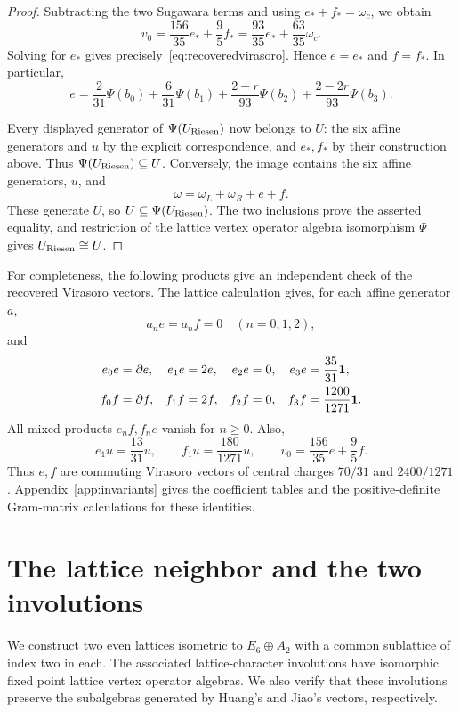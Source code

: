 \documentclass[11pt,reqno]{amsart}
\theoremstyle{definition}\newtheorem{definition}[theorem]{Definition}
\theoremstyle{remark}\newtheorem{remark}[theorem]{Remark}
\newcommand{\one}{\mathbf1}\newcommand{\slc}{\mathfrak{sl}_2}
\numberwithin{equation}{section}
\begin{document}
\begin{proof}
Subtracting the two Sugawara terms and using $e_*+f_*=\omega_c$, we obtain
\[
 v_0=\frac{156}{35}e_*+\frac95f_*
     =\frac{93}{35}e_*+\frac{63}{35}\omega_c.
\]
Solving for $e_*$ gives precisely~\eqref{eq:recoveredvirasoro}. Hence $e=e_*$ and $f=f_*$. In particular,
\begin{equation}\label{eq:riesenaxis}
 e=\frac2{31}\Psi(b_0)+\frac6{31}\Psi(b_1)
       +\frac{2-r}{93}\Psi(b_2)+\frac{2-2r}{93}\Psi(b_3).
\end{equation}

Every displayed generator of $\Psi(U_{\rm Riesen})$ now belongs to $U$: the six affine generators and $u$ by the explicit correspondence, and $e_*,f_*$ by their construction above. Thus $\Psi(U_{\rm Riesen})\subseteq U$. Conversely, the image contains the six affine generators, $u$, and
\[
 \omega=\omega_L+\omega_R+e+f.
\]
These generate $U$, so $U\subseteq\Psi(U_{\rm Riesen})$. The two inclusions prove the asserted equality, and restriction of the lattice vertex operator algebra isomorphism $\Psi$ gives $U_{\rm Riesen}\cong U$.
\end{proof}

For completeness, the following products give an independent check of the recovered Virasoro vectors. The lattice calculation gives, for each affine generator $a$,
\[
 a_ne=a_nf=0\quad(n=0,1,2),
\]
and
\begin{align}\label{eq:efproducts}
 e_0e&=\partial e,& e_1e&=2e,&e_2e&=0,&e_3e&=\frac{35}{31}\one,\notag\\
 f_0f&=\partial f,& f_1f&=2f,&f_2f&=0,&f_3f&=\frac{1200}{1271}\one.
\end{align}
All mixed products $e_nf,f_ne$ vanish for $n\ge0$. Also,
\[
 e_1u=\frac{13}{31}u,\qquad f_1u=\frac{180}{1271}u,\qquad
 v_0=\frac{156}{35}e+\frac95f.
\]
Thus $e,f$ are commuting Virasoro vectors of central charges $70/31$ and $2400/1271$. Appendix~\ref{app:invariants} gives the coefficient tables and the positive-definite Gram-matrix calculations for these identities.


\section{The lattice neighbor and the two involutions}\label{sec:neighbor}
We construct two even lattices isometric to $E_6\oplus A_2$ with a common sublattice of index two in each. The associated lattice-character involutions have isomorphic fixed point lattice vertex operator algebras. We also verify that these involutions preserve the subalgebras generated by Huang's and Jiao's vectors, respectively.
\end{document}
